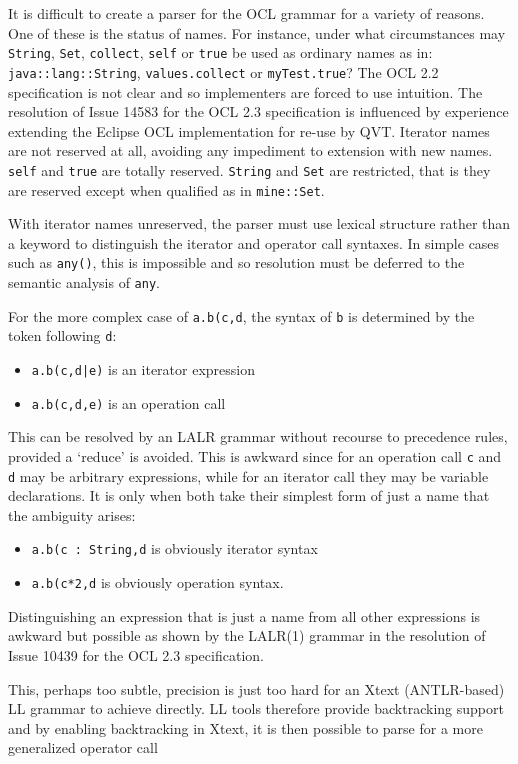 \documentclass{eceasst}
\begin{document}
It is difficult to create a parser for the OCL grammar for a variety of reasons. One of these is the status of names. For instance, under what circumstances may \verb+String+,  \verb+Set+,  \verb+collect+, \verb+self+ or \verb+true+ be used as ordinary names as in: \verb+java::lang::String+, \verb+values.collect+ or \verb+myTest.true+? The OCL 2.2 specification is not clear and so implementers are forced to use intuition. The resolution of Issue 14583\cite{OCL2.3} for the OCL 2.3 specification is influenced by experience extending the Eclipse OCL implementation for re-use by QVT. Iterator names are not reserved at all, avoiding any impediment to extension with new names. \verb+self+ and \verb+true+ are totally reserved. \verb+String+ and \verb+Set+ are restricted, that is they are reserved except when qualified as in \verb+mine::Set+.

With iterator names unreserved, the parser must use lexical structure rather than a keyword to distinguish the iterator and operator call syntaxes. In simple cases such as \verb+any()+, this is impossible and so resolution must be deferred to the semantic analysis of \verb+any+.

For the more complex case of \verb+a.b(c,d+, the syntax of \verb+b+ is determined by the token following \verb+d+:
\begin{itemize}
\item \verb+a.b(c,d|e)+ is an iterator expression
\item\verb+a.b(c,d,e)+ is an operation call
\end{itemize}
This can be resolved by an LALR grammar without recourse to precedence rules, provided a `reduce' is avoided. This is awkward since for an operation call \verb+c+ and \verb+d+ may be arbitrary expressions, while for an iterator call they may be variable declarations. It is only when both take their simplest form of just a name that the ambiguity arises:
\begin{itemize}
\item \verb+a.b(c : String,d+ is obviously iterator syntax
\item \verb+a.b(c*2,d+ is obviously operation syntax.
\end{itemize}
Distinguishing an expression that is just a name from all other expressions is awkward but possible as shown by the LALR(1) grammar in the resolution of Issue 10439\cite{OCL2.3} for the OCL 2.3 specification.

This, perhaps too subtle, precision is just too hard for an Xtext (ANTLR-based) LL grammar to achieve directly. LL tools therefore provide backtracking support and by enabling backtracking in Xtext, it is then possible to parse for a more generalized operator call
\end{document}
